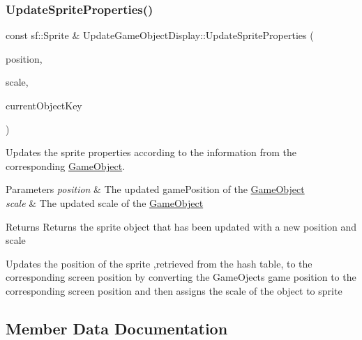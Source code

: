 \subsubsection{\texorpdfstring{Update\+Sprite\+Properties()}{UpdateSpriteProperties()}}
{\footnotesize\ttfamily const sf\+::\+Sprite \& Update\+Game\+Object\+Display\+::\+Update\+Sprite\+Properties (\begin{DoxyParamCaption}\item[{const \hyperlink{class_vector2_d}{Vector2D} \&}]{position,  }\item[{const \hyperlink{structxy_vector}{xy\+Vector} \&}]{scale,  }\item[{const string \&}]{current\+Object\+Key }\end{DoxyParamCaption})\hspace{0.3cm}{\ttfamily [private]}}



Updates the sprite properties according to the information from the corresponding \hyperlink{class_game_object}{Game\+Object}. 


\begin{DoxyParams}{Parameters}
{\em position} & The updated game\+Position of the \hyperlink{class_game_object}{Game\+Object} \\
\hline
{\em scale} & The updated scale of the \hyperlink{class_game_object}{Game\+Object} \\
\hline
\end{DoxyParams}
\begin{DoxyReturn}{Returns}
Returns the sprite object that has been updated with a new position and scale
\end{DoxyReturn}
Updates the position of the sprite ,retrieved from the hash table, to the corresponding screen position by converting the Game\+Oject\textquotesingle{}s game position to the corresponding screen position and then assigns the scale of the object to sprite 

\subsection{Member Data Documentation}
\mbox{\label{class_update_game_object_display_a51ae3f07958294b737885c9a0bd86153}} 
